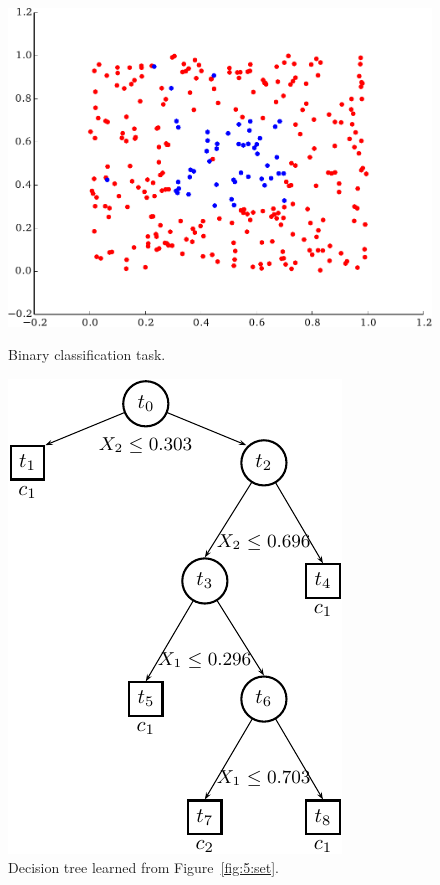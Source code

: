 \begin{figure}
\centering
\begin{minipage}{0.55\textwidth}
\hspace{-0.5cm}
\centering
    \includegraphics[width=\textwidth]{figures/ch5_learningset.pdf}
    \caption{Binary classification task.}
    \label{fig:5:set}
\end{minipage}\hfill
\begin{minipage}{0.45\textwidth}
\centering
    \includegraphics[scale=1.0]{figures/ch5_tree.pdf}
    \caption{Decision tree learned from Figure~\ref{fig:5:set}.}
    \label{fig:5:tree}
\end{minipage}
\end{figure}

